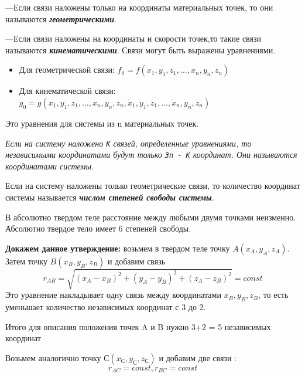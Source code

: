 \documentclass[../main.tex]{subfiles}
\begin{document}
\vspace{5px}

---Если связи наложены только на координаты материальных точек, то они называются \textbf{\textit{геометрическими}}.

\vspace{5px}

---Если связи наложены на координаты и скорости точек,то такие связи называются \textbf{\textit{кинематическими}}. Связи могут быть выражены уравнениями.
\begin{itemize}
    \item Для геометрической связи: $f_0 = f(x_1,y_1,z_1, \dots , x_n, y_n, z_n)$
    \item Для кинематической связи: $g_0 = g(x_1,y_1,z_1, \dots , x_n, y_n, z_n, \dot x_1,\dot y_1,\dot z_1, \dots , \dot x_n, \dot y_n,\dot z_n)$ %
\end{itemize}
Это уравнения для системы из n материальных точек.

\vspace{5px}

 \textit{Если на систему наложено \texttt{К} связей, определенные уравнениями, то независимыми координатами будут только \texttt{3n - K} координат. Они называются координатами системы.}

\vspace{5px}

 Если на систему наложены только геометрические связи, то количество координат системы называется \textbf{\textit{числом степеней свободы системы}}.

\vspace{5px}

В абсолютно твердом теле расстояние между любыми двумя точками неизменно. Абсолютно твердое тело имеет 6 степеней свободы.

\vspace{6px}

\textbf{Докажем данное утверждение:} возьмем в твердом теле точку $ A(x_A,y_A,z_A)$. Затем точку $ B(x_{B},y_{B},z_{B})$ и добавим связь \[ r_{AB} = \sqrt{(x_A-x_B)^2 + (y_A-y_B)^2 + (z_A-z_B)^2} = const \]
Это уравнение накладывает одну связь между координатами $x_B, y_B,z_B$, то есть уменьшает количество независимых координат с 3 до 2.

Итого для описания положения точек A и B нужно 3+2 = 5 независимых координат

Возьмем аналогично точку $ С(x_{С},y_{С},z_{С})$ и добавим две связи : \[ r_{AC} = const, r_{BC} = const \] %
\end{document}
